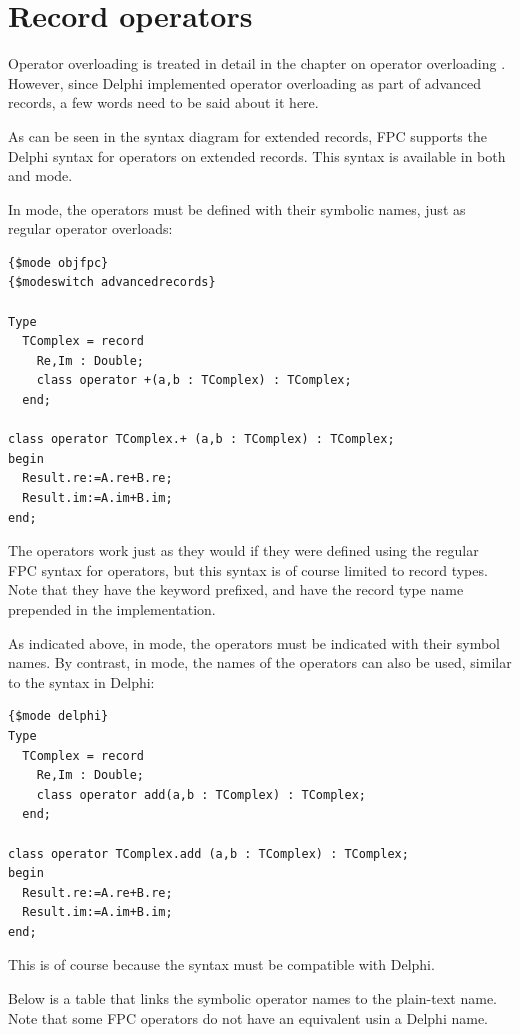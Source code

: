 \section{Record operators}
Operator overloading is treated in detail in the chapter on operator overloading .
However, since Delphi implemented operator overloading as part of advanced
records, a few words need to be said about it here.

As can be seen in the syntax diagram for extended records, FPC supports the Delphi syntax for operators on extended
records. This syntax is available in both  and  mode.

In  mode, the operators must be defined with their symbolic
names, just as regular operator overloads:
\begin{verbatim}
{$mode objfpc}
{$modeswitch advancedrecords}

Type
  TComplex = record
    Re,Im : Double;
    class operator +(a,b : TComplex) : TComplex;
  end;

class operator TComplex.+ (a,b : TComplex) : TComplex;
begin
  Result.re:=A.re+B.re;
  Result.im:=A.im+B.im;
end;
\end{verbatim}
The operators work just as they would if they were defined using the regular FPC syntax for
operators, but this syntax is of course limited to record types.
Note that they have the  keyword prefixed, and have the record type
name prepended in the implementation.


As indicated above, in  mode, the operators must be indicated with their symbol names.
By contrast, in  mode, the names of the operators can also be used, similar to the syntax in Delphi:
\begin{verbatim}
{$mode delphi}
Type
  TComplex = record
    Re,Im : Double;
    class operator add(a,b : TComplex) : TComplex;
  end;

class operator TComplex.add (a,b : TComplex) : TComplex;
begin
  Result.re:=A.re+B.re;
  Result.im:=A.im+B.im;
end;
\end{verbatim}
This is of course because the syntax must be compatible with Delphi.

Below is a table that links the symbolic operator names to the plain-text
name. Note that some FPC operators do not have an equivalent usin a Delphi
name.


